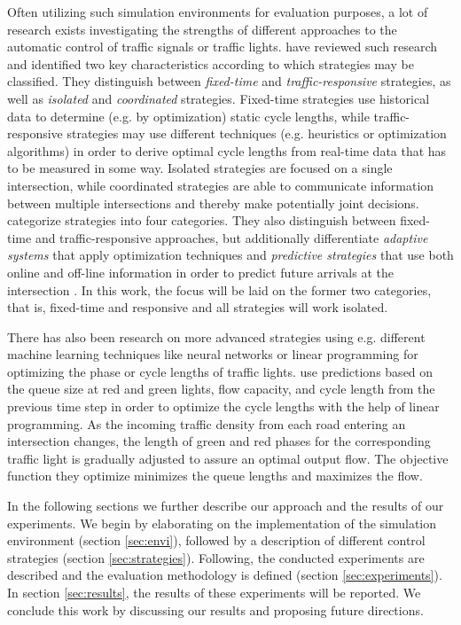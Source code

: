 \documentclass[11pt]{article}
\begin{document}
Often utilizing such simulation environments for evaluation purposes, a lot of research exists investigating the strengths of different approaches to the automatic control of traffic signals or traffic lights. \citet{papageorgiou2003review} have reviewed such research and identified two key characteristics according to which strategies may be classified. They distinguish between \textit{fixed-time} and \textit{traffic-responsive} strategies, as well as \textit{isolated} and \textit{coordinated} strategies. Fixed-time strategies use historical data to determine (e.g. by optimization) static cycle lengths, while traffic-responsive strategies may use different techniques (e.g. heuristics or optimization algorithms) in order to derive optimal cycle lengths from real-time data that has to be measured in some way. Isolated strategies are focused on a single intersection, while coordinated strategies are able to communicate information between multiple intersections and thereby make potentially joint decisions. \citet{coll2013linear} categorize strategies into four categories. They also distinguish between fixed-time and traffic-responsive approaches, but additionally differentiate \textit{adaptive systems} that apply optimization techniques and \textit{predictive strategies} that use both online and off-line information in order to predict future arrivals at the intersection \citep{coll2013linear}. In this work, the focus will be laid on the former two categories, that is, fixed-time and responsive and all strategies will work isolated.

There has also been research on more advanced strategies using e.g. different machine learning techniques like neural networks \citep[e.g.][]{srinivasan2006neural, chao2008intelligent} or linear programming \citep[e.g.][]{coll2013linear, lin2004enhanced} for optimizing the phase or cycle lengths of traffic lights. \citet[][]{coll2013linear} use predictions based on the queue size at red and green lights, flow capacity, and cycle length from the previous time step in order to optimize the cycle lengths with the help of linear programming. As the incoming traffic density from each road entering an intersection changes, the length of green and red phases for the corresponding traffic light is gradually adjusted to assure an optimal output flow. The objective function they optimize minimizes the queue lengths and maximizes the flow. 

\vspace{20pt}

In the following sections we further describe our approach and the results of our experiments. We begin by elaborating on the implementation of the simulation environment (section \ref{sec:envi}), followed by a description of different control strategies (section \ref{sec:strategies}). Following, the conducted experiments are described and the evaluation methodology is defined (section \ref{sec:experiments}). In section \ref{sec:results}, the results of these experiments will be reported. We conclude this work by discussing our results and proposing future directions.
	
\end{document}
